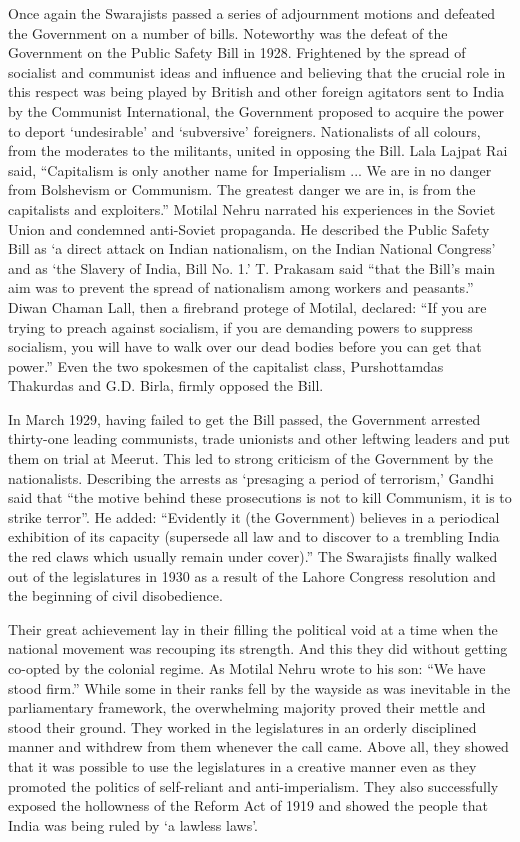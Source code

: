 \begin{multicols}{2}
Once again the Swarajists passed a series of adjournment motions and defeated the Government on a number of bills. Noteworthy was the defeat of the Government on the Public Safety Bill in 1928. Frightened by the spread of socialist and communist ideas and influence and believing that the crucial role in this respect was being played by British and other foreign agitators sent to India by the Communist International, the Government proposed to acquire the power to deport `undesirable' and `subversive' foreigners. Nationalists of all colours, from the moderates to the militants, united in opposing the Bill. Lala Lajpat Rai said, ``Capitalism is only another name for Imperialism ... We are in no danger from Bolshevism or Communism. The greatest danger we are in, is from the capitalists and exploiters.'' Motilal Nehru narrated his experiences in the Soviet Union and condemned anti-Soviet propaganda. He described the Public Safety Bill as `a direct attack on Indian nationalism, on the Indian National Congress' and as `the Slavery of India, Bill No. 1.' T. Prakasam said ``that the Bill's main aim was to prevent the spread of nationalism among workers and peasants.'' Diwan Chaman Lall, then a firebrand protege of Motilal, declared: ``If you are trying to preach against socialism, if you are demanding powers to suppress socialism, you will have to walk over our dead bodies before you can get that power.'' Even the two spokesmen of the capitalist class, Purshottamdas Thakurdas and G.D. Birla, firmly opposed the Bill.

In March 1929, having failed to get the Bill passed, the Government arrested thirty-one leading communists, trade unionists and other leftwing leaders and put them on trial at Meerut. This led to strong criticism of the Government by the nationalists. Describing the arrests as `presaging a period of terrorism,' Gandhi said that ``the motive behind these prosecutions is not to kill Communism, it is to strike terror''. He added: ``Evidently it (the Government) believes in a periodical exhibition of its capacity (supersede all law and to discover to a trembling India the red claws which usually remain under cover).'' The Swarajists finally walked out of the legislatures in 1930 as a result of the Lahore Congress resolution and the beginning of civil disobedience.

Their great achievement lay in their filling the political void at a time when the national movement was recouping its strength. And this they did without getting co-opted by the colonial regime. As Motilal Nehru wrote to his son: ``We have stood firm.'' While some in their ranks fell by the wayside as was inevitable in the parliamentary framework, the overwhelming majority proved their mettle and stood their ground. They worked in the legislatures in an orderly disciplined manner and withdrew from them whenever the call came. Above all, they showed that it was possible to use the legislatures in a creative manner even as they promoted the politics of self-reliant and anti-imperialism. They also successfully exposed the hollowness of the Reform Act of 1919 and showed the people that India was being ruled by `a lawless laws'.


\end{multicols}
